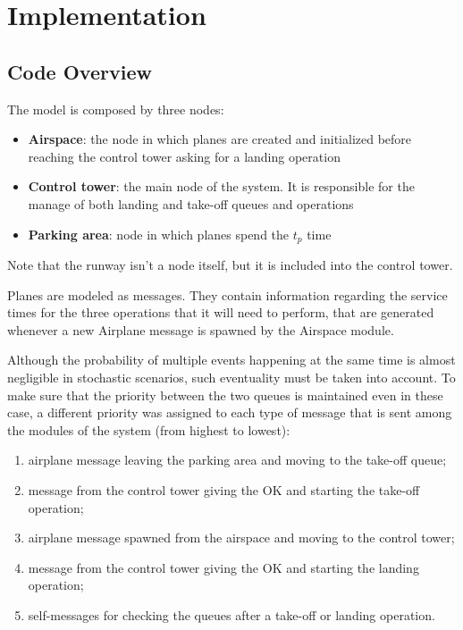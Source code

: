 \documentclass[12pt]{article}
\begin{document}
\section{Implementation}
\subsection{Code Overview}
The model is composed by three nodes:
\begin{itemize}
	\item \textbf{Airspace}: the node in which planes are created and initialized before reaching the control tower asking for a landing operation
	\item  \textbf{Control tower}: the main node of the system. It is responsible for the manage of both landing and take-off queues and operations
	\item  \textbf{Parking area}: node in which planes spend the $t_p$ time
\end{itemize}
Note that the runway isn't a node itself, but it is included into the control tower.

Planes are modeled as messages. They contain information regarding the service times for the three operations that it will need to perform, that are generated whenever a new Airplane message is spawned by the Airspace module.

Although the probability of multiple events happening at the same time is almost negligible in stochastic scenarios, such eventuality must be taken into account. To make sure that the priority between the two queues is maintained even in these case, a different priority was assigned to each type of message that is sent among the modules of the system (from highest to lowest):
\begin{enumerate}[label=\arabic*)]
	\item airplane message leaving the parking area and moving to the take-off queue;
	\item message from the control tower giving the OK and starting the take-off operation;
	\item airplane message spawned from the airspace and moving to the control tower;
	\item message from the control tower giving the OK and starting the landing operation;
	\item self-messages for checking the queues after a take-off or landing operation.
\end{enumerate}
\end{document}
